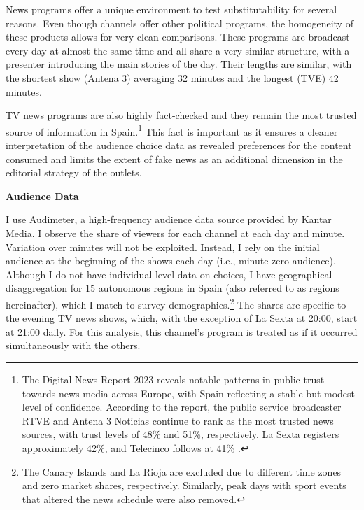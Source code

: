 \documentclass[12pt]{article}
\begin{document}
		News programs offer a unique environment to test substitutability for several reasons. Even though channels offer other political programs, the homogeneity of these products allows for very clean comparisons. These programs are broadcast every day at almost the same time and all share a very similar structure, with a presenter introducing the main stories of the day. Their lengths are similar, with the shortest show (Antena 3) averaging 32 minutes and the longest (TVE) 42 minutes.
		
		TV news programs are also highly fact-checked and they remain the most trusted source of information in Spain.\footnote{The Digital News Report 2023 reveals notable patterns in public trust towards news media across Europe, with Spain reflecting a stable but modest level of confidence. According to the report, the public service broadcaster RTVE and Antena 3 Noticias continue to rank as the most trusted news sources, with trust levels of 48\% and 51\%, respectively. La Sexta registers  approximately 42\%, and Telecinco follows at 41\% \citep{reuters_dnr_2023}.} This fact is important as it ensures a cleaner interpretation of the audience choice data as revealed preferences for the content consumed and limits the extent of fake news as an additional dimension in the editorial strategy of the outlets. 
		
	
	\textbf{Audience Data}
	
	I use Audimeter, a high-frequency audience data source provided by Kantar Media. I observe the share of viewers for each channel at each day and minute. Variation over minutes will not be exploited. Instead, I rely on the initial audience at the beginning of the shows each day (i.e., minute-zero audience).
	Although I do not have individual-level data on choices, I have geographical disaggregation for 15 autonomous regions in Spain (also referred to as regions hereinafter), which I match to survey demographics.\footnote{The Canary Islands and La Rioja are excluded due to different time zones and zero market shares, respectively. Similarly, peak days with sport events that altered the news schedule were also removed.} The shares are specific to the evening TV news shows, which, with the exception of La Sexta at 20:00, start at 21:00 daily. For this analysis, this channel’s program is treated as if it occurred simultaneously with the others.
	
	
\end{document}
